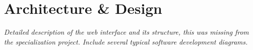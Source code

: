 
\chapter{Architecture \& Design}

\textit{Detailed description of the web interface and its structure, this was missing from the specialization project.
Include several typical software development diagrams.}

\cleardoublepage